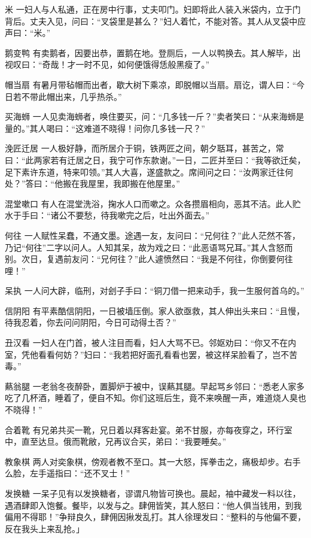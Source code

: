 \documentclass[12pt,UTF8]{ctexbook}
\begin{document}
米
一妇人与人私通，正在房中行事，丈夫叩门。妇即将此人装入米袋内，立于门背后。丈夫入见，问曰：“叉袋里是甚么？”妇人着忙，不能对答。其人从叉袋中应声曰：“米。”

鹅变鸭
有卖鹅者，因要出恭，置鹅在地。登厕后，一人以鸭换去。其人解毕，出视叹曰：“奇哉！才一时不见，如何便饿得恁般黑瘦了。”

帽当扇
有暑月带毡帽而出者，歇大树下乘凉，即脱帽以当扇。扇讫，谓人曰：“今日若不带此帽出来，几乎热杀。”

买海蛳
一人见卖海蛳者，唤住要买，问：“几多钱一斤？”卖者笑曰：“从来海蛳是量的。”其人喝曰：“这难道不晓得！问你几多钱一尺？”

浼匠迁居
一人极好静，而所居介于铜，铁两匠之间，朝夕聒耳，甚苦之，常曰：“此两家若有迁居之日，我宁可作东款谢。”一日，二匠并至曰：“我等欲迁矣，足下素许东道，特来叩领。”其人大喜，遂盛款之。席间问之曰：“汝两家迁往何处？”答曰：“他搬在我屋里，我即搬在他屋里。”

混堂嗽口
有人在混堂洗浴，掬水人口而嗽之。众各攒眉相向，恶其不洁。此人贮水于手曰：“诸公不要愁，待我嗽完之后，吐出外面去。”

何往
一人赋性呆蠢，不通文墨。途遇一友，友问曰：“兄何往？”此人茫然不答，乃记“何往”二字以问人。人知其呆，故为戏之曰：“此恶语骂兄耳。”其人含怒而别。次日，复遇前友问：“兄何往？”此人遽愤然曰：“我是不何往，你倒要何往哩！”

呆执
一人问大辟，临刑，对刽子手曰：“铜刀借一把来动手，我一生服何首乌的。”

信阴阳
有平素酷信阴阳，一日被墙压倒。家人欲亟救，其人伸出头来曰：“且慢，待我忍着，你去问问阴阳，今日可动得土否？”

丑汉看
一妇人在门首，被人注目而看，妇人大骂不已。邻妪劝曰：“你又不在内室，凭他看看何妨？”妇曰：“我若把好面孔看看也罢，被这样呆脸看了，岂不苦毒。”

爇翁腿
一老翁冬夜醉卧，置脚炉于被中，误爇其腿。早起骂乡邻曰：“悉老人家多吃了几杯酒，睡着了，便自不知。你们这班后生，竟不来唤醒一声，难道烧人臭也不晓得！”

合着靴
有兄弟共买一靴，兄日着以拜客赴宴。弟不甘服，亦每夜穿之，环行室中，直至达旦。俄而靴敝，兄再议合买，弟曰：“我要睡矣。”

教象棋
两人对奕象棋，傍观者教不至口。其一大怒，挥拳击之，痛极却步。右手么脸，左手遥指曰：“还不叉士！”

发换糖
一呆子见有以发换糖者，谬谓凡物皆可换也。晨起，袖中藏发一料以往，遇酒肆即入饱餐。餐毕，以发与之。肆佣皆笑，其人怒曰：“他人俱当钱用，到我偏用不得耶！”争辩良久，肆佣因揪发乱打。其人徐理发曰：“整料的与他偏不要，反在我头上来乱抢。」
\end{document}
